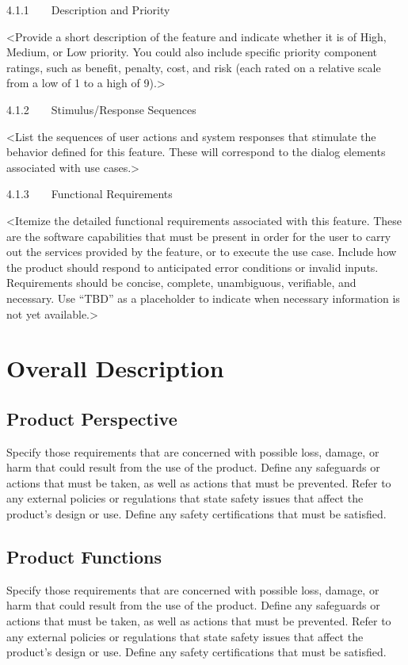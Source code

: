 \documentclass{scrreprt}
\begin{document}
4.1.1    Description and Priority

<Provide a short description of the feature and indicate whether it is of High, Medium, or Low priority. You could also include specific priority component ratings, such as benefit, penalty, cost, and risk (each rated on a relative scale from a low of 1 to a high of 9).>

4.1.2    Stimulus/Response Sequences

<List the sequences of user actions and system responses that stimulate the behavior defined for this feature. These will correspond to the dialog elements associated with use cases.>

4.1.3    Functional Requirements

<Itemize the detailed functional requirements associated with this feature. These are the software capabilities that must be present in order for the user to carry out the services provided by the feature, or to execute the use case. Include how the product should respond to anticipated error conditions or invalid inputs. Requirements should be concise, complete, unambiguous, verifiable, and necessary. Use “TBD” as a placeholder to indicate when necessary information is not yet available.>
    
    \chapter{Overall Description} 
    \section{Product Perspective}
    Specify those requirements that are concerned with possible loss, damage, or harm that could result from the use of the product. Define any safeguards or actions that must be taken, as well as actions that must be prevented. Refer to any external policies or regulations that state safety issues that affect the product’s design or use. Define any safety certifications that must be satisfied.
    \section{Product Functions}
    Specify those requirements that are concerned with possible loss, damage, or harm that could result from the use of the product. Define any safeguards or actions that must be taken, as well as actions that must be prevented. Refer to any external policies or regulations that state safety issues that affect the product’s design or use. Define any safety certifications that must be satisfied.
\end{document}
